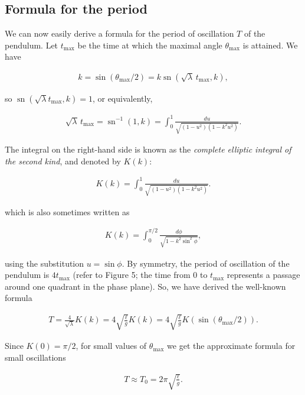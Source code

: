 \documentclass[11pt]{report}
\theoremstyle{plain}
\theoremstyle{definition}
\begin{document}
\subsection{Formula for the period}
We can now easily derive a formula for the period of
oscillation $T$ of the pendulum. Let
$t_{\textrm{max}}$ be the time at which the maximal
angle $\theta_{\textrm{max}}$ is attained. We have

\begin{align*}
k = \sin(\theta_{\textrm{max}}/2) = k \operatorname{sn}(\sqrt{\lambda}\, t_{\textrm{max}},k),
\end{align*}

so
$\operatorname{sn}(\sqrt{\lambda}
t_{\textrm{max}},k)=1$,
or equivalently,

\begin{align*}
\sqrt{\lambda}\, t_{\textrm{max}} = \operatorname{sn}^{-1}(1,k) = \int_0^1 \frac{du}{\sqrt{(1-u^2)(1-k^2u^2)}}.
\end{align*}

The integral on the right-hand side is known as the
\emph{complete elliptic integral of the second kind}, and
denoted by $K(k)$:

\begin{align*}
K(k) = \int_0^1 \frac{du}{\sqrt{(1-u^2)(1-k^2u^2)}}.
\end{align*}

which is also sometimes written as

\begin{align*}
K(k) = \int_0^{\pi/2} \frac{d\phi}{\sqrt{1-k^2 \sin^2\phi}},
\end{align*}

using the substitution $u=\sin \phi$. By symmetry,
the period of oscillation of the pendulum is
$4t_{\textrm{max}}$ (refer to Figure 5; the time from
$0$ to $t_{\textrm{max}}$ represents a passage around
one quadrant in the phase plane). So, we have derived
the well-known formula

\begin{align*}
T= \frac{4}{\sqrt{\lambda}}K(k) = 4\sqrt{\frac{\ell}{g}} K(k)
= 4\sqrt{\frac{\ell}{g}} K(\sin (\theta_{\textrm{max}}/2)).
\end{align*}

Since $K(0)=\pi/2$, for small values of
$\theta_{\textrm{max}}$ we get the approximate
formula for small oscillations

\begin{align*}
T \approx T_0 = 2\pi \sqrt{\frac{\ell}{g}}.
\end{align*}
\end{document}
